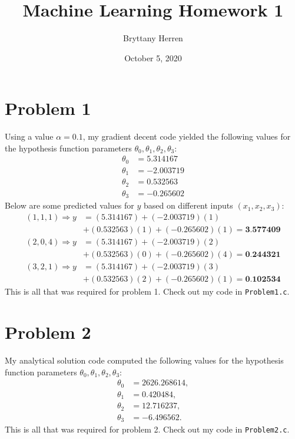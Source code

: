\documentclass{article}
\title{Machine Learning Homework 1}
\author{Bryttany Herren}
\date{October 5, 2020}
\begin{document}
\maketitle

\section{Problem 1}

Using a value $\alpha = 0.1$, my gradient decent code yielded the following values for the hypothesis function parameters $\theta_0, \theta_1, \theta_2, \theta_3$:
\begin{align}
    \theta_0 &= 5.314167 \\
    \theta_1 &= -2.003719 \\
    \theta_2 &= 0.532563 \\
    \theta_3 &= -0.265602
\end{align}
Below are some predicted values for $y$ based on different inputs $(x_1,x_2,x_3)$:
\begin{align}
    (1,1,1) \Rightarrow y   &= (5.314167) + (-2.003719)(1) \nonumber \\
                            &+ (0.532563)(1) + (-0.265602)(1) = \textbf{3.577409} \\
    (2,0,4) \Rightarrow y   &= (5.314167) + (-2.003719)(2) \nonumber \\
                            &+ (0.532563)(0) + (-0.265602)(4) = \textbf{0.244321} \\
    (3,2,1) \Rightarrow y   &= (5.314167) + (-2.003719)(3) \nonumber \\
                            &+ (0.532563)(2) + (-0.265602)(1) = \textbf{0.102534} 
\end{align}
This is all that was required for problem 1. Check out my code in \texttt{Problem1.c}.

\section{Problem 2}
My analytical solution code computed the following values for the hypothesis function parameters $\theta_0, \theta_1, \theta_2, \theta_3$:
\begin{align}
    \theta_0 &= 2626.268614, \\
    \theta_1 &= 0.420484, \\
    \theta_2 &= 12.716237, \\
    \theta_3 &= -6.496562.
\end{align}
This is all that was required for problem 2. Check out my code in \texttt{Problem2.c}.
\end{document}
